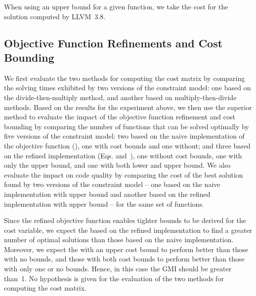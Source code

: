 When using an upper bound for a given \gls{function}, we take the cost for the
\gls{solution} computed by \mbox{\gls{LLVM} 3.8}.


\subsection{Objective Function Refinements and Cost Bounding}

We first evaluate the two methods for computing the cost matrix by comparing the
solving times exhibited by two versions of the \gls{constraint model}: one based
on the \gls{divide-then-multiply method}, and another based on
\glspl{multiply-then-divide method}.
%
Based on the results for the experiment above, we then use the superior method
to evaluate the impact of the \gls{objective function} refinement and cost
bounding by comparing the number of \glspl{function} that can be solved
optimally by five versions of the \gls{constraint model}: two based on the naive
implementation of the \gls{objective function}
(), one with cost bounds and one without;
and three based on the refined implementation
(Eqs.\thinspace{}
and~), one without cost bounds, one with only the upper
bound, and one with both lower and upper bound.
%
We also evaluate the impact on code quality by comparing the cost of the best
\gls{solution} found by two versions of the \gls{constraint model} -- one based
on the naive implementation with upper bound and another based on the refined
implementation with upper bound -- for the same set of \glspl{function}.

Since the refined \gls{objective function} enables tighter bounds to be derived
for the \gls{cost variable}, we expect the  based
on the refined implementation to find a greater number of optimal
\glspl{solution} than those based on the naive implementation.
%
Moreover, we expect the  with an upper cost bound
to perform better than those with no bounds, and those with both cost bounds to
perform better than those with only one or no bounds.
%
Hence, in this case the \gls{GMI} should be greater than~\num{1}.
%
No hypothesis is given for the evaluation of the two methods for computing the
cost matrix.




